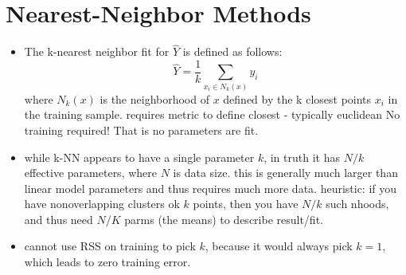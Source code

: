\documentclass[a4paper]{report}
\newcommand{\<}{\textless}
\renewcommand{\>}{\textgreater}
\begin{document}
\section{Nearest-Neighbor Methods}
\begin{itemize}
  \item The k-nearest neighbor fit for $\hat{Y}$ is defined as follows:
    $$ \hat{Y} = \frac{1}{k} \sum_{x_i \in N_k(x)} y_i $$
    where $N_k(x)$ is the neighborhood of $x$ defined by the k closest points $x_i$ in the training sample.
    \subitem requires metric to define closest - typically euclidean
    \subitem No training required! That is no parameters are fit.
  \item while k-NN appears to have a single parameter $k$, in truth it has $N/k$ effective parameters, where $N$ is data size.
    \subitem this is generally much larger than linear model parameters and thus requires much more data.
    \subitem heuristic: if you have nonoverlapping clusters ok $k$ points, then you have $N/k$ such nhoods, and thus need $N/K$ parms (the means) to describe result/fit.
  \item cannot use RSS on training to pick $k$, because it would always pick $k=1$, which leads to zero training error.
\end{itemize}
\end{document}
